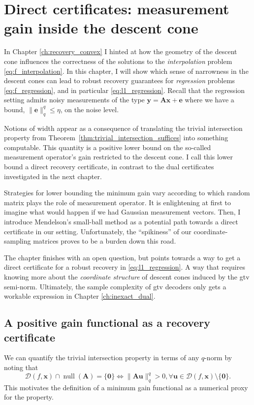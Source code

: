 \chapter{Direct certificates: measurement gain inside the descent cone}
\label{ch:lower_bound_min_gain}

In Chapter \ref{ch:recovery_convex} I hinted at how the geometry of the descent cone influences the correctness of the solutions to the \emph{interpolation} problem \eqref{eq:f_interpolation}. In this chapter, I will show which sense of narrowness in the descent cones can lead to robust recovery guarantees for \emph{regression} problems \eqref{eq:f_regression}, and in particular \eqref{eq:l1_regression}. Recall that the regression setting admits noisy measurements of the type $\mathbf{y} = \mathbf{Ax} + \mathbf{e}$ where we have a bound, $\|\mathbf{e}\|_q^q \leq \eta$, on the noise level.

Notions of width appear as a consequence of translating the trivial intersection property from Theorem~\ref{thm:trivial_intersection_suffices} into something computable. This quantity is a positive lower bound on the so-called measurement operator's gain restricted to the descent cone. I call this lower bound a direct recovery certificate, in contrast to the dual certificates investigated in the next chapter.

Strategies for lower bounding the minimum gain vary according to which random matrix plays the role of measurement operator. It is enlightening at first to imagine what would happen if we had Gaussian measurement vectors. Then, I introduce Mendelson's small-ball method as a potential path towards a direct certificate in our setting. Unfortunately, the ``spikiness'' of our coordinate-sampling matrices proves to be a burden down this road.

The chapter finishes with an open question, but points towards a way to get a direct certificate for a robust recovery in \eqref{eq:l1_regression}. A way that requires knowing more about the \emph{coordinate structure} of descent cones induced by the \acrshort{gtv} semi-norm. Ultimately, the sample complexity of \acrshort{gtv} decoders only gets a workable expression in Chapter \ref{ch:inexact_dual}.


\section{A positive gain functional as a recovery certificate}

We can quantify the trivial intersection property in terms of any $q$-norm by noting that
\begin{equation}
    \mathcal{D}(f, \mathbf{x}) \cap \operatorname{null} \left ( \mathbf{A} \right ) = \{ \mathbf{0} \} \iff \|\mathbf{Au}\|_q^q > 0, \forall \mathbf{u} \in \mathcal{D}(f, \mathbf{x}) \setminus \{ \mathbf{0} \}.
    \label{eq:trivial_intersect_equiv_lower_bound_gain}
\end{equation}
This motivates the definition of a minimum gain functional as a numerical proxy for the property.


